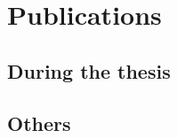 \chapter*{Publications}


\section*{During the thesis}
\begin{refsection}[duringthesis]
  \small
  \nocite{*} %
  \printbibliography[heading=none]
\end{refsection}

\section*{Others}
\begin{refsection}[outsidethesis]
  \small
  \nocite{*} %
  \printbibliography[heading=none]
\end{refsection}